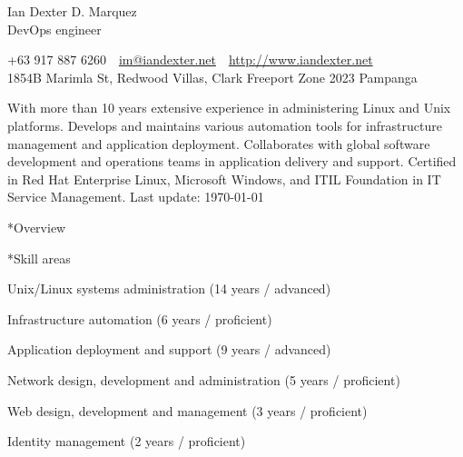 \documentclass[10pt, a4paper, final]{article}
\begin{document}
\begin{center}
  \Huge Ian Dexter D. Marquez\\
  \Large DevOps engineer
\end{center}

\begin{center}\begin{spacing}{1}\small
  +63 917 887 6260~\textbullet~\href{mailto:im@iandexter.net}{im@iandexter.net}~\textbullet~\href{http://www.iandexter.net}{http://www.iandexter.net}\\
  1854B Marimla St, Redwood Villas, Clark Freeport Zone 2023 Pampanga\\
  
\end{spacing}\end{center}
\vspace{1.5em}

\normalsize With more than 10 years extensive experience in administering Linux and Unix platforms. Develops and maintains various automation tools for infrastructure management and application deployment. Collaborates with global software development and operations teams in application delivery and support. Certified in Red Hat Enterprise Linux, Microsoft Windows, and ITIL Foundation in IT Service Management. \small \textcolor{dark-gray}{Last update: \textsc{\today}} \normalsize

\vspace{1em}

\begin{section}*{Overview}
  \begin{subsection}*{Skill areas}
    \begin{compactitem}
      \item Unix/Linux systems administration (14 years / advanced) 
      \item Infrastructure automation (6 years / proficient) 
      \item Application deployment and support (9 years / advanced) 
      \item Network design, development and administration (5 years / proficient) 
      \item Web design, development and management (3 years / proficient) 
      \item Identity management (2 years / proficient) 
    \end{compactitem}
  \end{subsection}
\end{section}
\end{document}
